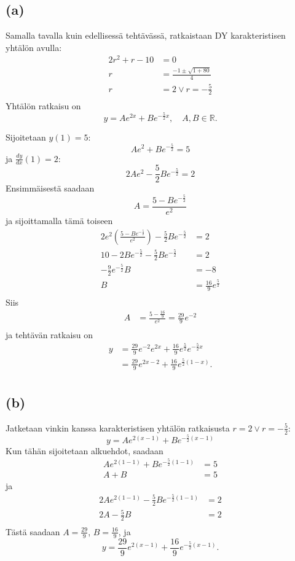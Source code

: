 \documentclass{article}
\begin{document}
\subsection*{(a)}

Samalla tavalla kuin edellisessä tehtävässä, ratkaistaan DY
karakteristisen yhtälön avulla:
\begin{align*}
  2r^2 + r - 10 &= 0 \\
  r &= \frac{-1 \pm \sqrt{1 + 80}}{4} \\
  r &= 2 \vee r = -\frac{5}{2} \\
\end{align*}
Yhtälön ratkaisu on
\[
  y = Ae^{2x} + Be^{-\frac{5}{2}x}, \quad A, B \in \mathbb{R}.
\]

Sijoitetaan $y(1) = 5$:
\[
  Ae^{2} + Be^{-\frac{5}{2}} = 5
\]
ja $\frac{dy}{dx}(1) = 2$:
\[
  2Ae^{2} - \frac{5}{2}Be^{-\frac{5}{2}} = 2
\]
Ensimmäisestä saadaan
\[
  A = \frac{5 - Be^{-\frac{5}{2}}}{e^2}
\]
ja sijoittamalla tämä toiseen
\begin{align*}
  2e^2(\frac{5 - Be^{-\frac{5}{2}}}{e^2}) - \frac{5}{2}Be^{-\frac{5}{2}} &= 2 \\
  10 - 2Be^{-\frac{5}{2}} - \frac{5}{2}Be^{-\frac{5}{2}} &= 2 \\
  -\frac{9}{2}e^{-\frac{5}{2}}B &= -8 \\
  B &= \frac{16}{9}e^{\frac{5}{2}} \\
\end{align*}
Siis
\begin{align*}
  A &= \frac{5 - \frac{16}{9}}{e^2} = \frac{29}{9}e^{-2} \\
\end{align*}
ja tehtävän ratkaisu on
\begin{align*}
  y &= \frac{29}{9}e^{-2}e^{2x} + \frac{16}{9}e^{\frac{5}{2}}e^{-\frac{5}{2}x} \\
    &= \frac{29}{9}e^{2x - 2} + \frac{16}{9}e^{\frac{5}{2}(1 - x)}. \\
\end{align*}

\subsection*{(b)}

Jatketaan vinkin kanssa karakteristisen yhtälön ratkaisusta
$r = 2 \vee r = -\frac{5}{2}$:
\[
  y = Ae^{2(x-1)} + Be^{-\frac{5}{2}(x-1)}
\]
Kun tähän sijoitetaan alkuehdot, saadaan
\begin{align*}
  Ae^{2(1-1)} + Be^{-\frac{5}{2}(1-1)} &= 5 \\
  A + B &= 5
\end{align*}
ja
\begin{align*}
  2Ae^{2(1-1)} - \frac{5}{2}Be^{-\frac{5}{2}(1-1)} &= 2 \\
  2A - \frac{5}{2}B &= 2 \\
\end{align*}
Tästä saadaan $A = \frac{29}{9}$, $B = \frac{16}{9}$, ja
\[
  y = \frac{29}{9}e^{2(x-1)} + \frac{16}{9}e^{-\frac{5}{2}(x-1)}.
\]
\end{document}
